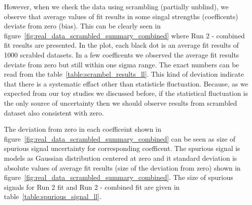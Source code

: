 However, when we check the data using scrambling (partially unblind), we observe 
that average values of fit results in some singal strengths (coefficents) deviate 
from zero (bias). This can be clearly seen in figure~\ref{fig:real_data_scrambled_summary_combined}
where Run 2 - combined fit results are presented. In the plot, each black dot is an average fit results 
of 1000 scrabled datasets. In a few coefficents we observed the average fit results deviate from zero
but still within one sigma range. The exact numbers can be read from the table~\ref{table:scrambel_results_ll}.
This kind of deviation indicate that there is a systematic effact other than statisticle fluctuation. 
Because, as we expected from our toy studies we discussed before, if the statistical fluctuation is the 
only source of uncertainty then we should observe results from scrambled dataset also consistent with zero.

The deviation from zero in each coefficeint shown in figure~\ref{fig:real_data_scrambled_summary_combined} can be seen
as size of spurious signal uncertainty for corresponding coefficent.
 The spurious signal is models as Gaussian distribution centered at zero and it standard deviation
  is absolute values of average fit results (size of the deviation from zero) shown in figure~\ref{fig:real_data_scrambled_summary_combined}.
  The size of spurious signals for Run 2 fit and Run 2 - combined fit are given in table~\ref{table:spurious_signal_ll}.
  

